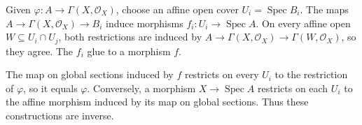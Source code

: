 Given $\varphi:A\to\Gamma(X,\mathcal O_X)$, choose an affine open cover $U_i=\operatorname{Spec}B_i$. The maps $A\to\Gamma(X,\mathcal O_X)\to B_i$ induce morphisms $f_i:U_i\to\operatorname{Spec}A$. On every affine open $W\subseteq U_i\cap U_j$, both restrictions are induced by $A\to\Gamma(X,\mathcal O_X)\to\Gamma(W,\mathcal O_X)$, so they agree. The $f_i$ glue to a morphism $f$.

The map on global sections induced by $f$ restricts on every $U_i$ to the restriction of $\varphi$, so it equals $\varphi$. Conversely, a morphism $X\to\operatorname{Spec}A$ restricts on each $U_i$ to the affine morphism induced by its map on global sections. Thus these constructions are inverse.
